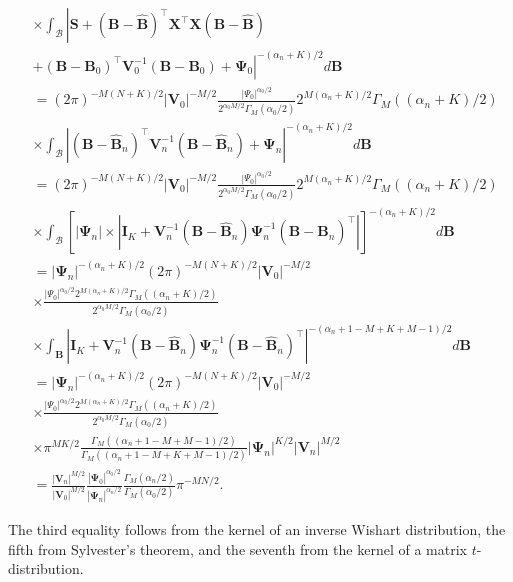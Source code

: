\begin{align*}
	&\times \int_{\mathcal{B}}\left|{\bm{S}}+({\bm{B}}-\widehat{\bm{B}})^{\top}{\bm{X}}^{\top}{\bm{X}}({\bm{B}}-\widehat{\bm{B}})\right.\\
	&\left.+({\bm{B}}-{\bm{B}}_{0})^{\top}{\bm{V}}_{0}^{-1}({\bm{B}}-{\bm{B}}_{0})+{\bm{\Psi}}_0\right|^{-(\alpha_n+K)/2}d{\bm{B}}\\
	&=(2\pi)^{-M(N+K)/2}\left|{\bm V}_0\right|^{-M/2}\frac{|\Psi_0|^{\alpha_0/2}}{2^{\alpha_0M/2}\Gamma_M(\alpha_0/2)}2^{M(\alpha_n+K)/2}\Gamma_M((\alpha_n+K)/2)\\
	&\times \int_{\mathcal{B}}\left|({\bm{B}}-\widehat{\bm{B}}_n)^{\top}{\bm{V}}_n^{-1}({\bm{B}}-\widehat{\bm{B}}_n)+{\bm{\Psi}}_n\right|^{-(\alpha_n+K)/2}d{\bm{B}}\\ 
	&=(2\pi)^{-M(N+K)/2}\left|{\bm V}_0\right|^{-M/2}\frac{|\Psi_0|^{\alpha_0/2}}{2^{\alpha_0M/2}\Gamma_M(\alpha_0/2)}2^{M(\alpha_n+K)/2}\Gamma_M((\alpha_n+K)/2)\\
	&\times \int_{\mathcal{B}}\left[|{\bm{\Psi}}_n|\times |{\bm{I}}_{K}+{\bm{V}}_n^{-1}({\bm{B}}-\widehat{\bm{B}}_n){\bm{\Psi}}_n^{-1}({\bm{B}}-\widehat{\bm{B}}_n)^{\top}|\right]^{-(\alpha_n+K)/2}d{\bm{B}}\\
	&=|{\bm{\Psi}}_n|^{-(\alpha_n+K)/2}(2\pi)^{-M(N+K)/2}\left|{\bm V}_0\right|^{-M/2}\\
	&\times \frac{|\Psi_0|^{\alpha_0/2}2^{M(\alpha_n+K)/2}\Gamma_M((\alpha_n+K)/2)}{2^{\alpha_0M/2}\Gamma_M(\alpha_0/2)}\\
	&\times \int_{\mathcal{{\bm{B}}}}\left| {\bm{I}}_{K}+{\bm{V}}_n^{-1}({\bm{B}}-\widehat{\bm{B}}_n){\bm{\Psi}}_n^{-1}({\bm{B}}-\widehat{\bm{B}}_n)^{\top}\right|^{-(\alpha_n+1-M+K+M-1)/2}d{\bm{B}}\\
	&=|{\bm{\Psi}}_n|^{-(\alpha_n+K)/2}(2\pi)^{-M(N+K)/2}\left|{\bm V}_0\right|^{-M/2}\\
	&\times \frac{|\Psi_0|^{\alpha_0/2}2^{M(\alpha_n+K)/2}\Gamma_M((\alpha_n+K)/2)}{2^{\alpha_0M/2}\Gamma_M(\alpha_0/2)}\\
	&\times \pi^{MK/2}\frac{\Gamma_M((\alpha_n+1-M+M-1)/2)}{\Gamma_M((\alpha_n+1-M+K+M-1)/2)}|{\bm{\Psi}}_n|^{K/2}|{\bm{V}}_n|^{M/2}\\
	&=\frac{|{\bm{V}}_n|^{M/2}}{|{\bm{V}}_0|^{M/2}}\frac{|{\bm{\Psi}}_0|^{\alpha_0/2}}{|{\bm{\Psi}}_n|^{\alpha_n/2}}\frac{\Gamma_M(\alpha_n/2)}{\Gamma_M(\alpha_0/2)}\pi^{-MN/2}.  
\end{align*}


The third equality follows from the kernel of an inverse Wishart distribution, the fifth from Sylvester's theorem, and the seventh from the kernel of a matrix $t$-distribution.

